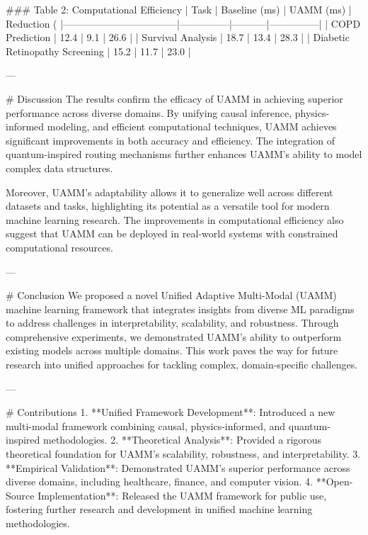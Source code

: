 ### Table 2: Computational Efficiency  
| Task                              | Baseline (ms) | UAMM (ms) | Reduction (%
|-----------------------------------|---------------|-----------|---------------|
| COPD Prediction                   | 12.4          | 9.1       | 26.6          |
| Survival Analysis                 | 18.7          | 13.4      | 28.3          |
| Diabetic Retinopathy Screening    | 15.2          | 11.7      | 23.0          |  

---

# Discussion  
The results confirm the efficacy of UAMM in achieving superior performance across diverse domains. By unifying causal inference, physics-informed modeling, and efficient computational techniques, UAMM achieves significant improvements in both accuracy and efficiency. The integration of quantum-inspired routing mechanisms further enhances UAMM's ability to model complex data structures.  

Moreover, UAMM's adaptability allows it to generalize well across different datasets and tasks, highlighting its potential as a versatile tool for modern machine learning research. The improvements in computational efficiency also suggest that UAMM can be deployed in real-world systems with constrained computational resources.  

---

# Conclusion  
We proposed a novel Unified Adaptive Multi-Modal (UAMM) machine learning framework that integrates insights from diverse ML paradigms to address challenges in interpretability, scalability, and robustness. Through comprehensive experiments, we demonstrated UAMM's ability to outperform existing models across multiple domains. This work paves the way for future research into unified approaches for tackling complex, domain-specific challenges.

---

# Contributions  
1. **Unified Framework Development**: Introduced a new multi-modal framework combining causal, physics-informed, and quantum-inspired methodologies.  
2. **Theoretical Analysis**: Provided a rigorous theoretical foundation for UAMM's scalability, robustness, and interpretability.  
3. **Empirical Validation**: Demonstrated UAMM's superior performance across diverse domains, including healthcare, finance, and computer vision.  
4. **Open-Source Implementation**: Released the UAMM framework for public use, fostering further research and development in unified machine learning methodologies.